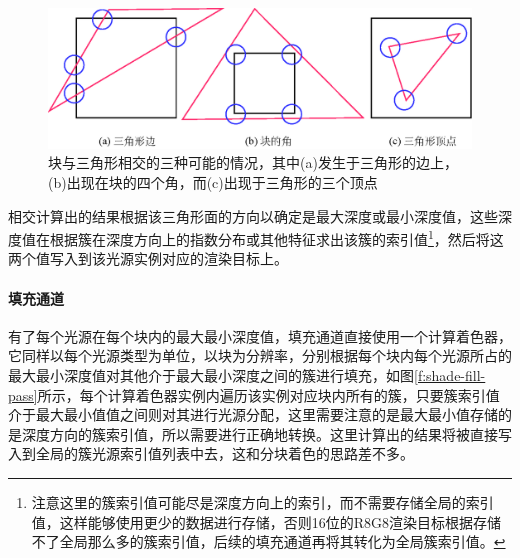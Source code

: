 \begin{figure}
	\includegraphics[width=\textwidth]{figures/shade/tile-triangle}
	\caption{块与三角形相交的三种可能的情况，其中(a)发生于三角形的边上，(b)出现在块的四个角，而(c)出现于三角形的三个顶点}
	\label{f:shade-tile-triangle}
\end{figure}

相交计算出的结果根据该三角形面的方向以确定是最大深度或最小深度值，这些深度值在根据簇在深度方向上的指数分布或其他特征求出该簇的索引值\footnote{注意这里的簇索引值可能尽是深度方向上的索引，而不需要存储全局的索引值，这样能够使用更少的数据进行存储，否则16位的R8G8渲染目标根据存储不了全局那么多的簇索引值，后续的填充通道再将其转化为全局簇索引值。}，然后将这两个值写入到该光源实例对应的渲染目标上。





\paragraph{填充通道}
有了每个光源在每个块内的最大最小深度值，填充通道直接使用一个计算着色器，它同样以每个光源类型为单位，以块为分辨率，分别根据每个块内每个光源所占的最大最小深度值对其他介于最大最小深度之间的簇进行填充，如图\ref{f:shade-fill-pass}所示，每个计算着色器实例内遍历该实例对应块内所有的簇，只要簇索引值介于最大最小值值之间则对其进行光源分配，这里需要注意的是最大最小值存储的是深度方向的簇索引值，所以需要进行正确地转换。这里计算出的结果将被直接写入到全局的簇光源索引值列表中去，这和分块着色的思路差不多。

